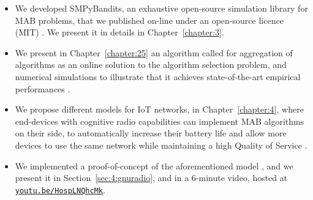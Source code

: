 \begin{itemize}


    \item
    We developed SMPyBandits, an exhaustive open-source simulation library for MAB problems, that we published on-line under an open-source licence (MIT) \cite{SMPyBanditsJMLR,SMPyBandits}.
    We present it in details in Chapter~\ref{chapter:3}.

    \item
    We present in Chapter~\ref{chapter:25} an algorithm called \Aggr{} for aggregation of algorithms as an online solution to the algorithm selection problem, and numerical simulations to illustrate that it achieves state-of-the-art empirical performances
    \cite{Besson2018WCNC}.

    \item
    We propose different models for IoT networks, in Chapter~\ref{chapter:4}, where end-devices with cognitive radio capabilities can implement MAB algorithms on their side, to automatically increase their battery life and allow more devices to use the same network while maintaining a high Quality of Service
    \cite{Bonnefoi17,Besson2019WCNC,Bonnefoi2019WCNC,MoyBesson2019,MoyBesson2019Annales}.

    \item
    We implemented a proof-of-concept of the aforementioned model \cite{Besson2018ICT}, and we present it in Section~\ref{sec:4:gnuradio},
    and in a $6$-minute video, hosted at
    \texttt{\href{https://youtu.be/HospLNQhcMk}{youtu.be/HospLNQhcMk}}.


\end{itemize}
